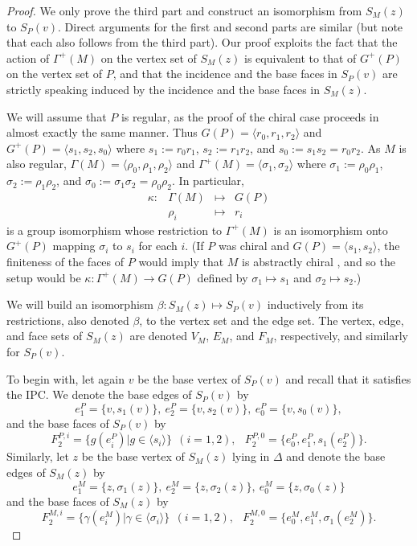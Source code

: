 \documentclass[12pt]{article}
\theoremstyle{definition}\newtheorem{definition}{Definition}[section]
\begin{document}
\begin{proof}
We only prove the third part and construct an isomorphism from ${S}_M(z)$ to ${S}_P(v)$. Direct arguments for the first and second  parts are similar (but note that each also follows from the third part). Our proof exploits the fact that the action of $\Gamma^+(M)$ on the vertex set of ${S}_M(z)$ is equivalent to that of $G^+(P)$ on the vertex set of $P$, and that the incidence and the base faces in ${S}_P(v)$ are strictly speaking induced by the incidence and the base faces in ${S}_M(z)$. \smallskip

We will assume that $P$ is regular, as the proof of the chiral case proceeds in almost exactly the same manner. Thus $G(P) = \langle r_0, r_1, r_2\rangle$ and $G^+(P)=\langle s_1, s_2,s_0\rangle$ where $s_1:=r_0r_1$, $s_2:= r_1r_2$, and $s_{0}:=s_1s_2=r_0r_2$. As $M$ is also regular, $\Gamma(M) = \langle \rho_0, \rho_1, \rho_2\rangle$ and $\Gamma^+(M) = \langle\sigma_1,\sigma_2\rangle$ where $\sigma_1 := \rho_0\rho_1$, $\sigma_2 := \rho_1\rho_2$, and $\sigma_0 := \sigma_1\sigma_2=\rho_0\rho_2$. In particular, 
\[\begin{array}{rrcl}
\kappa:& \Gamma(M)& \mapsto& G(P)\\
&\rho_i &\mapsto& r_i
\end{array}\]
is a group isomorphism whose restriction to $\Gamma^+(M)$ is an isomorphism onto $G^+(P)$ mapping $\sigma_i$ to $s_i$ for each $i$. (If $P$ was chiral and $G(P)=\langle s_1,s_2\rangle$, the finiteness of the faces of $P$ would imply that $M$ is abstractly chiral \cite{47}, and so the setup would be $\kappa: \Gamma^+(M)\rightarrow G(P)$ defined by $\sigma_1 \mapsto s_1$ and $\sigma_2 \mapsto s_2$.) \smallskip

We will build an isomorphism $\beta:{S}_M(z) \mapsto {S}_P(v)$ inductively from its restrictions, also denoted $\beta$, to the vertex set and the edge set. The vertex, edge, and face sets of ${S}_M(z)$ are denoted $V_M$, $E_M$, and $F_M$, respectively, and similarly for ${S}_P(v)$.

To begin with, let again $v$ be the base vertex of ${S}_P(v)$ and recall that it satisfies the IPC. We denote the base edges of ${S}_P(v)$ by 
$$e_1^P = \{v,s_1(v)\}, \ e_2^P = \{v,s_2(v)\}, \ e_0^P = \{v,s_0(v)\},$$ 
and the base faces of ${S}_P(v)$ by 
$$F_2^{P,i} = \{g(e_i^P)|g\in \langle s_i \rangle\} \;\, (i=1,2), \;\;\, F_2^{P,0} = \{e_0^P,e_1^P,s_1(e_2^P)\}.$$ 
Similarly, let $z$ be the base vertex of ${S}_M(z)$ lying in $\Delta$ and denote the base edges of ${S}_M(z)$ by  
$$e_1^M = \{z,\sigma_1(z)\}, \ e_2^M = \{z,\sigma_2(z)\},\ e_0^M = \{z,\sigma_0(z)\}$$ and the base faces of ${S}_M(z)$ by 
$$F_2^{M,i} = \{\gamma(e_i^M)|\gamma\in \langle \sigma_i\rangle\} \;\, (i=1,2), \;\;\, F_2^{M,0} = \{e_0^M,e_1^M,\sigma_1(e_2^M)\}.$$ 


\end{proof}
\end{document}
